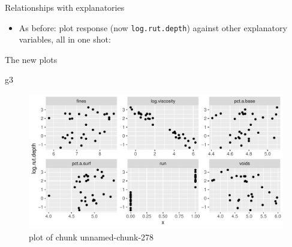 \documentclass[ignorenonframetext,]{beamer}
\newenvironment{Shaded}{\begin{snugshade}}{\end{snugshade}}
\newcommand{\DataTypeTok}[1]{\textcolor[rgb]{0.13,0.29,0.53}{#1}}
\newcommand{\DecValTok}[1]{\textcolor[rgb]{0.00,0.00,0.81}{#1}}
\newcommand{\KeywordTok}[1]{\textcolor[rgb]{0.13,0.29,0.53}{\textbf{#1}}}
\newcommand{\NormalTok}[1]{#1}
\newcommand{\OperatorTok}[1]{\textcolor[rgb]{0.81,0.36,0.00}{\textbf{#1}}}
\newcommand{\StringTok}[1]{\textcolor[rgb]{0.31,0.60,0.02}{#1}}
\providecommand{\tightlist}{%
  \setlength{\itemsep}{0pt}\setlength{\parskip}{0pt}}
\begin{document}
\begin{frame}[fragile]{Relationships with explanatories}
\protect\hypertarget{relationships-with-explanatories}{}

\begin{itemize}
\tightlist
\item
  As before: plot response (now \texttt{log.rut.depth}) against other
  explanatory variables, all in one shot:
\end{itemize}

\begin{Shaded}
\end{Shaded}

\end{frame}

\begin{frame}[fragile]{The new plots}
\protect\hypertarget{the-new-plots}{}

\begin{Shaded}
\begin{Highlighting}[]
\NormalTok{g3}
\end{Highlighting}
\end{Shaded}

\begin{figure}
\centering
\includegraphics{figure/unnamed-chunk-278-1.pdf}
\caption{plot of chunk unnamed-chunk-278}
\end{figure}

\end{frame}
\end{document}
